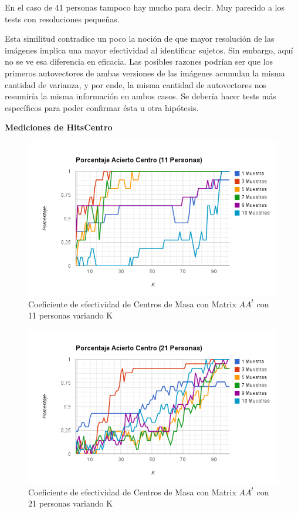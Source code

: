 En el caso de 41 personas tampoco hay mucho para decir. Muy parecido a los tests 
con resoluciones pequeñas.

Esta similitud contradice un poco la noción de que mayor resolución de las imágenes implica una
mayor efectividad al identificar sujetos. Sin embargo, aquí no se ve esa diferencia en eficacia. Las
posibles razones podrían ser que los primeros autovectores de ambas versiones de las imágenes
acumulan la misma cantidad de varianza, y por ende, la misma cantidad de autovectores nos resumiría
la misma información en ambos casos. Se debería hacer tests más específicos para poder confirmar
ésta u otra hipótesis.

\textbf{Mediciones de HitsCentro }

\begin{figure}[H] \includegraphics[width=1\textwidth]{img/imagef13.png} \caption{Coeficiente de
    efectividad de Centros de Masa con Matrix $AA^t$ con 11 personas variando K} \end{figure}

\begin{figure}[H] \includegraphics[width=1\textwidth]{img/imagef14.png} \caption{Coeficiente de
    efectividad de Centros de Masa con Matrix $AA^t$ con 21 personas variando K} \end{figure}

